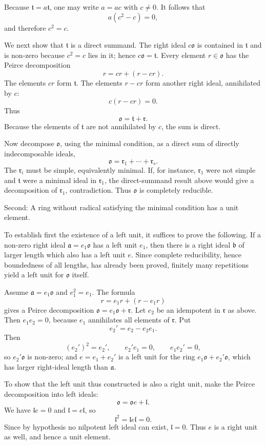 \documentclass[11pt]{article}
\begin{document}
Because \(\mathfrak t=a\mathfrak t\), one may write \(a=ac\) with
\(c\ne0\). It follows that \[
  a(c^2-c)=0,
\] and therefore \(c^2=c\).

We next show that \(\mathfrak t\) is a direct summand. The right ideal
\(c\mathfrak{o}\) is contained in \(\mathfrak t\) and is non-zero
because \(c^2=c\) lies in it; hence \(c\mathfrak{o}=\mathfrak t\). Every
element \(r\in\mathfrak{o}\) has the Peirce decomposition \[
  r=cr+(r-cr).
\] The elements \(cr\) form \(\mathfrak t\). The elements \(r-cr\) form
another right ideal, annihilated by \(c\): \[
  c(r-cr)=0.
\] Thus \[
  \mathfrak{o}=\mathfrak t+\mathfrak r.
\] Because the elements of \(\mathfrak t\) are not annihilated by \(c\),
the sum is direct.

Now decompose \(\mathfrak{o}\), using the minimal condition, as a direct
sum of directly indecomposable ideals, \[
  \mathfrak{o}=\mathfrak r_1+\cdots+\mathfrak r_s.
\] The \(\mathfrak r_i\) must be simple, equivalently minimal. If, for
instance, \(\mathfrak r_1\) were not simple and \(\mathfrak t\) were a
minimal ideal in \(\mathfrak r_1\), the direct-summand result above
would give a decomposition of \(\mathfrak r_1\), contradiction. Thus
\(\mathfrak{o}\) is completely reducible.

Second: A ring without radical satisfying the minimal condition has a
unit element.

To establish first the existence of a left unit, it suffices to prove
the following. If a non-zero right ideal \(\mathfrak a=e_1\mathfrak{o}\)
has a left unit \(e_1\), then there is a right ideal \(\mathfrak b\) of
larger length which also has a left unit \(e\). Since complete
reducibility, hence boundedness of all lengths, has already been proved,
finitely many repetitions yield a left unit for \(\mathfrak{o}\) itself.

Assume \(\mathfrak a=e_1\mathfrak{o}\) and \(e_1^2=e_1\). The formula \[
  r=e_1r+(r-e_1r)
\] gives a Peirce decomposition
\(\mathfrak{o}=e_1\mathfrak{o}+\mathfrak r\). Let \(e_2\) be an
idempotent in \(\mathfrak r\) as above. Then \(e_1e_2=0\), because
\(e_1\) annihilates all elements of \(\mathfrak r\). Put \[
  e_2'=e_2-e_2e_1.
\] Then \[
  (e_2')^2=e_2',
  \qquad
  e_2'e_1=0,
  \qquad
  e_1e_2'=0,
\] so \(e_2'\mathfrak{o}\) is non-zero; and \(e=e_1+e_2'\) is a left
unit for the ring \(e_1\mathfrak{o}+e_2'\mathfrak{o}\), which has larger
right-ideal length than \(\mathfrak a\).

To show that the left unit thus constructed is also a right unit, make
the Peirce decomposition into left ideals: \[
  \mathfrak{o}=\mathfrak{o}e+\mathfrak l.
\] We have \(\mathfrak l e=0\) and \(\mathfrak l=e\mathfrak l\), so \[
  \mathfrak l^2=\mathfrak l e\mathfrak l=0.
\] Since by hypothesis no nilpotent left ideal can exist,
\(\mathfrak l=0\). Thus \(e\) is a right unit as well, and hence a unit
element.
\end{document}
